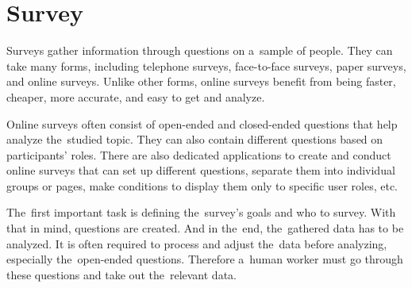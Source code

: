 \chapter{Survey}
\label{survey}

Surveys gather information through questions on a~sample of people.
They can take many forms, including telephone surveys, face-to-face surveys, paper surveys, and online surveys.
Unlike other forms, online surveys benefit from being faster, cheaper, more accurate, and easy to get and analyze.

Online surveys often consist of open-ended and closed-ended questions that help analyze the~studied topic.
They can also contain different questions based on participants' roles.
There are also dedicated applications to create and conduct online surveys that can set up different questions, separate them into individual groups or pages, make conditions to display them only to specific user roles, etc.

The~first important task is defining the~survey's goals and who to survey.
With that in mind, questions are created.
And in the~end, the~gathered data has to be analyzed.
It is often required to process and adjust the~data before analyzing, especially the~open-ended questions.
Therefore a~human worker must go through these questions and take out the~relevant data.



